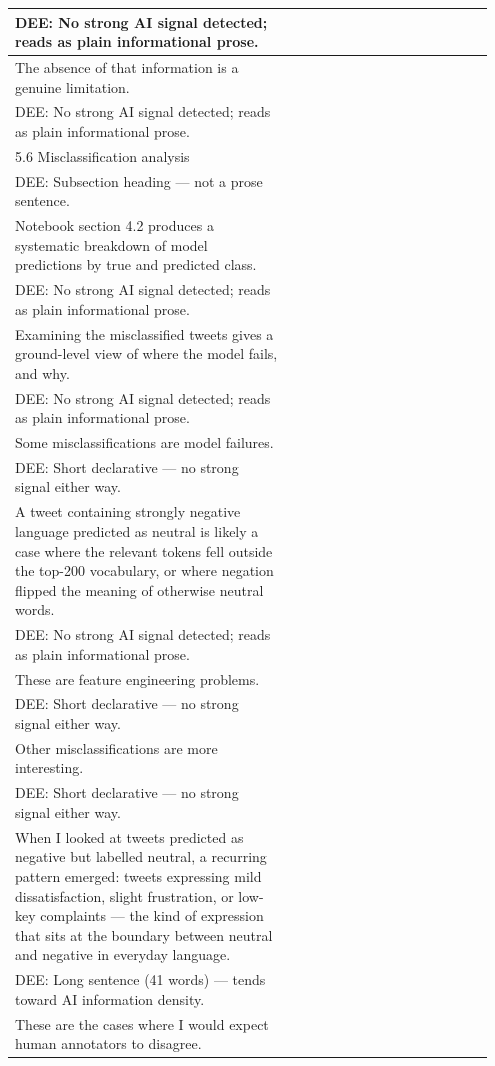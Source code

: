 \documentclass[11pt]{article}
\begin{document}
\begin{longtable}{|p{0.55\linewidth}|p{0.40\linewidth}|}
\hline
DEE: No strong AI signal detected; reads as plain informational prose. & \\
\hline
The absence of that information is a genuine limitation. & \\[2pt]
\hline
DEE: No strong AI signal detected; reads as plain informational prose. & \\
\hline
5.6 Misclassification analysis & \\[2pt]
\hline
DEE: Subsection heading --- not a prose sentence. & \\
\hline
Notebook section 4.2 produces a systematic breakdown of model predictions by true and predicted class. & \\[2pt]
\hline
DEE: No strong AI signal detected; reads as plain informational prose. & \\
\hline
Examining the misclassified tweets gives a ground-level view of where the model fails, and why. & \\[2pt]
\hline
DEE: No strong AI signal detected; reads as plain informational prose. & \\
\hline
Some misclassifications are model failures. & \\[2pt]
\hline
DEE: Short declarative --- no strong signal either way. & \\
\hline
A tweet containing strongly negative language predicted as neutral is likely a case where the relevant tokens fell outside the top-200 vocabulary, or where negation flipped the meaning of otherwise neutral words. & \\[2pt]
\hline
DEE: No strong AI signal detected; reads as plain informational prose. & \\
\hline
These are feature engineering problems. & \\[2pt]
\hline
DEE: Short declarative --- no strong signal either way. & \\
\hline
Other misclassifications are more interesting. & \\[2pt]
\hline
DEE: Short declarative --- no strong signal either way. & \\
\hline
When I looked at tweets predicted as negative but labelled neutral, a recurring pattern emerged: tweets expressing mild dissatisfaction, slight frustration, or low-key complaints --- the kind of expression that sits at the boundary between neutral and negative in everyday language. & \\[2pt]
\hline
DEE: Long sentence (41 words) --- tends toward AI information density. & \\
\hline
These are the cases where I would expect human annotators to disagree. & \\[2pt]

\end{longtable}
\end{document}
